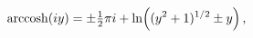 \[\mathop{\mathrm{arccosh}\/}\nolimits\!\left(iy\right)=\pm\tfrac{1}{2}\pi i+%
\mathop{\ln\/}\nolimits\!\left((y^{2}+1)^{1/2}\pm y\right),\]